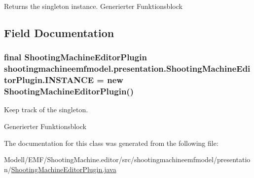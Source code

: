 \begin{DoxyReturn}{Returns}
the singleton instance. Generierter Funktionsblock 
\end{DoxyReturn}


\subsection{Field Documentation}
\hypertarget{classshootingmachineemfmodel_1_1presentation_1_1_shooting_machine_editor_plugin_a390b8850284c755e1f2caa4565d87982}{
\subsubsection[{I\-N\-S\-T\-A\-N\-C\-E}]{\setlength{\rightskip}{0pt plus 5cm}final {\bf Shooting\-Machine\-Editor\-Plugin} shootingmachineemfmodel.\-presentation.\-Shooting\-Machine\-Editor\-Plugin.\-I\-N\-S\-T\-A\-N\-C\-E = new {\bf Shooting\-Machine\-Editor\-Plugin}()\hspace{0.3cm}{\ttfamily [static]}}}\label{classshootingmachineemfmodel_1_1presentation_1_1_shooting_machine_editor_plugin_a390b8850284c755e1f2caa4565d87982}
Keep track of the singleton.

Generierter Funktionsblock 

The documentation for this class was generated from the following file\-:\begin{DoxyCompactItemize}
\item 
Modell/\-E\-M\-F/\-Shooting\-Machine.\-editor/src/shootingmachineemfmodel/presentation/\hyperlink{_shooting_machine_editor_plugin_8java}{Shooting\-Machine\-Editor\-Plugin.\-java}\end{DoxyCompactItemize}
